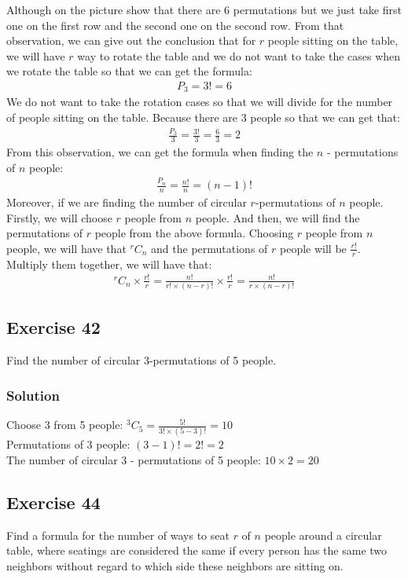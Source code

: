 \documentclass{article}
\theoremstyle{mytheoremstyle}
\theoremstyle{mytheoremstyle}
\theoremstyle{myproblemstyle}
\begin{document}
    Although on the picture show that there are 6 permutations but we just take first one on the first row and the
    second one on the second row. From that observation, we can give out the conclusion that for \(r\) people sitting on the
    table, we will have \(r\) way to rotate the table and we do not want to take the cases when we rotate the table so that
    we can get the formula:
    \begin{align*}
        P_3 = 3! = 6
    \end{align*}
    We do not want to take the rotation cases so that we will divide for the number of people sitting on the table. Because 
    there are 3 people so that we can get that:
    \begin{align*}
        \frac{P_3}{3} = \frac{3!}{3} = \frac{6}{3} = 2
    \end{align*}
    From this observation, we can get the formula when finding the \(n\) - permutations of \(n\) people:
    \begin{align*}
        \frac{P_n}{n} = \frac{n!}{n} = (n-1)!
    \end{align*}
    Moreover, if we are finding the number of circular \(r\)-permutations of \(n\) people. Firstly, we will choose \(r\) people
    from \(n\) people. And then, we will find the permutations of \(r\) people from the above formula. Choosing \(r\) people
    from \(n\) people, we will have that \(^rC_n\) and the permutations of \(r\) people will be \(\frac{r!}{r}\). Multiply them together,
    we will have that:
    \begin{align*}
        ^rC_n \times \frac{r!}{r} = \frac{n!}{r! \times (n - r)!} \times \frac{r!}{r} = \frac{n!}{r \times (n - r)!}
    \end{align*}
    \subsection*{Exercise 42}
    Find the number of circular 3-permutations of 5 people.
    \subsubsection*{Solution}
    Choose 3 from 5 people: \(^3C_5 = \frac{5!}{3! \times (5 - 3)!} = 10\)\\ 
    Permutations of 3 people: \((3 - 1)! = 2! = 2\)\\
    The number of circular 3 - permutations of 5 people: \(10 \times 2 = 20\)
    \subsection*{Exercise 44}
    Find a formula for the number of ways to seat \(r\) of \(n\) people around a circular table, where seatings are considered the same if every person has the same two neighbors without regard to which side these neighbors are sitting on.
\end{document}
